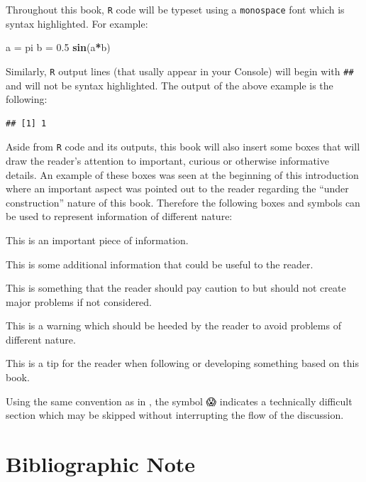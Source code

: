 \documentclass[]{book}
\newenvironment{Shaded}{\begin{snugshade}}{\end{snugshade}}
\newcommand{\FloatTok}[1]{\textcolor[rgb]{0.00,0.00,0.81}{#1}}
\newcommand{\KeywordTok}[1]{\textcolor[rgb]{0.13,0.29,0.53}{\textbf{#1}}}
\newcommand{\NormalTok}[1]{#1}
\newcommand{\OperatorTok}[1]{\textcolor[rgb]{0.81,0.36,0.00}{\textbf{#1}}}
\newcommand{\StringTok}[1]{\textcolor[rgb]{0.31,0.60,0.02}{#1}}
\theoremstyle{definition}
\theoremstyle{definition}
\theoremstyle{definition}
\theoremstyle{remark}
\let\BeginKnitrBlock\begin \let\EndKnitrBlock\end
\begin{document}
Throughout this book, \texttt{R} code will be typeset using a
\texttt{monospace} font which is syntax highlighted. For example:

\begin{Shaded}
\begin{Highlighting}[]
\NormalTok{a =}\StringTok{ }\NormalTok{pi}
\NormalTok{b =}\StringTok{ }\FloatTok{0.5}
\KeywordTok{sin}\NormalTok{(a}\OperatorTok{*}\NormalTok{b)}
\end{Highlighting}
\end{Shaded}

Similarly, \texttt{R} output lines (that usally appear in your Console)
will begin with \texttt{\#\#} and will not be syntax highlighted. The
output of the above example is the following:

\begin{verbatim}
## [1] 1
\end{verbatim}

Aside from \texttt{R} code and its outputs, this book will also insert
some boxes that will draw the reader's attention to important, curious
or otherwise informative details. An example of these boxes was seen at
the beginning of this introduction where an important aspect was pointed
out to the reader regarding the ``under construction'' nature of this
book. Therefore the following boxes and symbols can be used to represent
information of different nature:

\BeginKnitrBlock{rmdimportant}
This is an important piece of information.
\EndKnitrBlock{rmdimportant}

\BeginKnitrBlock{rmdnote}
This is some additional information that could be useful to the reader.
\EndKnitrBlock{rmdnote}

\BeginKnitrBlock{rmdcaution}
This is something that the reader should pay caution to but should not
create major problems if not considered.
\EndKnitrBlock{rmdcaution}

\BeginKnitrBlock{rmdwarning}
This is a warning which should be heeded by the reader to avoid problems
of different nature.
\EndKnitrBlock{rmdwarning}

\BeginKnitrBlock{rmdtip}
This is a tip for the reader when following or developing something
based on this book.
\EndKnitrBlock{rmdtip}

Using the same convention as in \citet{friedman2001elements}, the symbol
😱 indicates a technically difficult section which may be skipped without
interrupting the flow of the discussion.

\hypertarget{bibliographic-note}{%
\section{Bibliographic Note}\label{bibliographic-note}}
\end{document}

